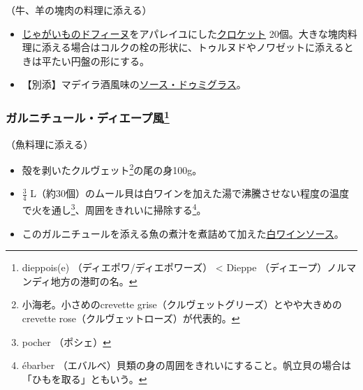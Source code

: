\begin{recette}


（牛、羊の塊肉の料理に添える）

\begin{itemize}
\item
  \protect\hyperlink{pomme-de-terres-dauphine}{じゃがいものドフィーヌ}をアパレイユにした\protect\hyperlink{croquettes}{クロケット}
  20個。大きな塊肉料理に添える場合はコルクの栓の形状に、トゥルヌドやノワゼットに添えるときは平たい円盤の形にする。
\item
  【別添】マデイラ酒風味の\protect\hyperlink{sauce-demi-glace}{ソース・ドゥミグラス}。
\end{itemize}

\atoaki{}

\hypertarget{garniture-dieppoise}{%
\subsubsection[ガルニチュール・ディエープ風]{\texorpdfstring{ガルニチュール・ディエープ風\footnote{dieppois(e)
  （ディエポワ/ディエポワーズ） \textless{} Dieppe
  （ディエープ）ノルマンディ地方の港町の名。}}{ガルニチュール・ディエープ風}}\label{garniture-dieppoise}}



（魚料理に添える）

\begin{itemize}
\item
  殻を剥いたクルヴェット\footnote{小海老。小さめのcrevette
    grise（クルヴェットグリーズ）とやや大きめのcrevette
    rose（クルヴェットローズ）が代表的。}の尾の身100g。
\item
  \(\frac{3}{4}\)
  L（約30個）のムール貝は白ワインを加えた湯で沸騰させない程度の温度で火を通し\footnote{pocher
    （ポシェ）}、周囲をきれいに掃除する\footnote{ébarber
    （エバルベ）貝類の身の周囲をきれいにすること。帆立貝の場合は「ひもを取る」ともいう。}。
\item
  このガルニチュールを添える魚の煮汁を煮詰めて加えた\protect\hyperlink{sauce-vin-blanc}{白ワインソース}。
\end{itemize}


\end{recette}
